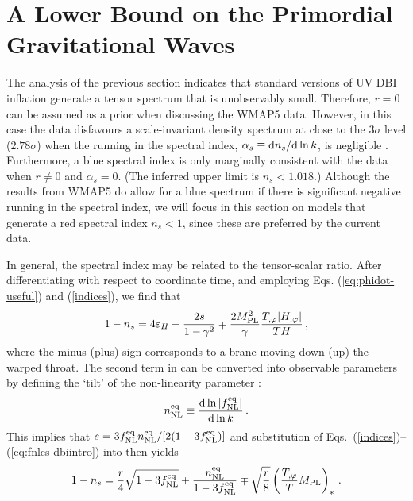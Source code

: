 \section{A Lower Bound on the Primordial Gravitational Waves} 
% 
\label{sec:lower-dbi}

The analysis of the previous section 
indicates that standard versions of UV DBI inflation generate a 
tensor spectrum that is unobservably 
small. Therefore, $r=0$ can be assumed as a prior when discussing the WMAP5
data.
However, in this case the data 
disfavours a scale-invariant density spectrum at close to the $3 \sigma$ level
($2.78\sigma$)
when the running in the spectral index, $\alpha_s \equiv \mathrm{d} n_s/\mathrm{d}\ln k$, 
is negligible \cite{Komatsu:2008hk}.  
Furthermore, a blue spectral index 
is only marginally consistent with the data when $r\ne 0$ and $\alpha_s=0$. 
(The inferred upper limit is $n_s < 1.018$.)
Although the results from WMAP5 do allow for a blue spectrum if there is 
significant negative running in the spectral index, we will 
focus in this section 
on models that generate a red spectral index $n_s<1$, since these are preferred by the current
data.  


In general, the spectral index may be related to the tensor-scalar ratio. 
After differentiating  
with respect to coordinate time, and employing Eqs. (\ref{eq:phidot-useful}) 
and (\ref{indices}), we find that\footnotemark
% 
\begin{equation}
\label{eq:nsconstraint}
1-n_s = 4 \varepsilon_H +\frac{2s}{1-\gamma^2} \mp 
\frac{2M_{\mathrm{PL}}^2}{\gamma} \frac{T_{,\varphi}|H_{,\varphi}|}{TH}  \,,
\end{equation}
% 
where the minus (plus) sign corresponds to 
a brane moving down (up) the warped throat.
%  
% 
The second term in 
can be converted into observable parameters
by defining the `tilt' of the non-linearity parameter  \cite{brane14}: 
% 
\begin{equation}
\label{eq:nnl-defn-dbi}
n_{\mathrm{NL}}^{\mathrm{eq}} \equiv \frac{\mathrm{d} \ln |f_{\mathrm{NL}}^{\mathrm{eq}}|}{\mathrm{d}\ln k}\,. 
\end{equation}
% 
This implies that $s=  3 f_{\mathrm{NL}}^{\mathrm{eq}} n_{\mathrm{NL}}^{\mathrm{eq}} /[2(1-3f_{\mathrm{NL}}^{\mathrm{eq}})]$ and     
substitution of Eqs.~(\ref{indices})--(\ref{eq:fnlcs-dbiintro}) 
into  then yields
% 
\begin{equation}
\label{eq:obscon1}
1-n_s = \frac{r}{4} \sqrt{1-3f_{\mathrm{NL}}^{\mathrm{eq}}} + \frac{n_{\mathrm{NL}}^{\mathrm{eq}}}{1-3f_{\mathrm{NL}}^{\mathrm{eq}}}
\mp \sqrt{\frac{r}{8}} \left( \frac{T_{,\varphi}}{T} M_{\mathrm{PL}} \right)_*  \,.
\end{equation}
% 


